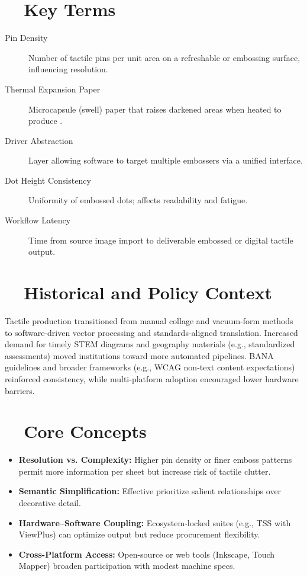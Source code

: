 \section{~~Key Terms}\label{ch14:sec:key-terms}
\begin{description}
	\item[Pin Density] Number of tactile pins per unit area on a refreshable or embossing surface, influencing resolution.
	\item[Thermal Expansion Paper] Microcapsule (swell) paper that raises darkened areas when heated to produce .
	\item[Driver Abstraction] Layer allowing software to target multiple embossers via a unified interface.
	\item[Dot Height Consistency] Uniformity of embossed dots; affects readability and fatigue.
	\item[Workflow Latency] Time from source image import to deliverable embossed or digital tactile output.
\end{description}

\section{~~Historical and Policy Context}\label{ch14:sec:historical-policy}
Tactile production transitioned from manual collage and vacuum‐form methods to software-driven vector processing and standards-aligned translation. Increased demand for timely STEM diagrams and geography materials (e.g., standardized assessments) moved institutions toward more automated pipelines. BANA  guidelines and broader  frameworks (e.g., WCAG non-text content expectations) reinforced consistency, while multi-platform adoption encouraged lower hardware barriers.

\section{~~Core Concepts}\label{ch14:sec:core-concepts}
\begin{itemize}
	\item \textbf{Resolution vs. Complexity:} Higher pin density or finer emboss patterns permit more information per sheet but increase risk of tactile clutter.
	\item \textbf{Semantic Simplification:} Effective  prioritize salient relationships over decorative detail.
	\item \textbf{Hardware–Software Coupling:} Ecosystem-locked suites (e.g., TSS with ViewPlus) can optimize output but reduce procurement flexibility.
	\item \textbf{Cross-Platform Access:} Open-source or web tools (Inkscape, Touch Mapper) broaden participation with modest machine specs.
\end{itemize}

